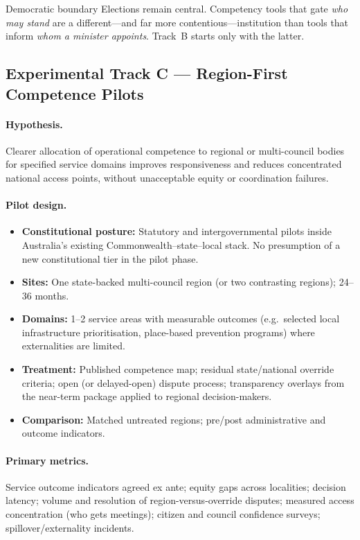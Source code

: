\documentclass[11pt,a4paper]{article}
\begin{document}
\begin{warningbox}{Democratic boundary}
Elections remain central. Competency tools that gate \emph{who may stand} are a different---and far more contentious---institution than tools that inform \emph{whom a minister appoints}. Track~B starts only with the latter.
\end{warningbox}

\subsection{Experimental Track C --- Region-First Competence Pilots}

\paragraph{Hypothesis.}
Clearer allocation of operational competence to regional or multi-council bodies for specified service domains improves responsiveness and reduces concentrated national access points, without unacceptable equity or coordination failures.

\paragraph{Pilot design.}
\begin{itemize}[leftmargin=*]
    \item \textbf{Constitutional posture:} Statutory and intergovernmental pilots inside Australia’s existing Commonwealth--state--local stack. No presumption of a new constitutional tier in the pilot phase.
    \item \textbf{Sites:} One state-backed multi-council region (or two contrasting regions); 24--36 months.
    \item \textbf{Domains:} 1--2 service areas with measurable outcomes (e.g.\ selected local infrastructure prioritisation, place-based prevention programs) where externalities are limited.
    \item \textbf{Treatment:} Published competence map; residual state/national override criteria; open (or delayed-open) dispute process; transparency overlays from the near-term package applied to regional decision-makers.
    \item \textbf{Comparison:} Matched untreated regions; pre/post administrative and outcome indicators.
\end{itemize}

\paragraph{Primary metrics.}
Service outcome indicators agreed ex ante; equity gaps across localities; decision latency; volume and resolution of region-versus-override disputes; measured access concentration (who gets meetings); citizen and council confidence surveys; spillover/externality incidents.
\end{document}
